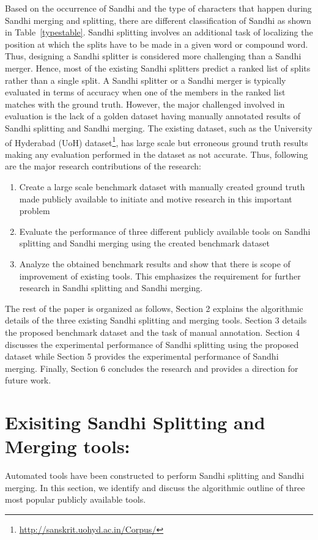 \documentclass[11pt]{article}
\begin{document}
Based on the occurrence of Sandhi and the type of characters that happen during Sandhi merging and splitting, there are different classification of Sandhi as shown in Table~\ref{typestable}. Sandhi splitting involves an additional task of localizing the position at which the splits have to be made in a given word or compound word. Thus, designing a Sandhi splitter is considered more challenging than a Sandhi merger. Hence, most of the existing Sandhi splitters predict a ranked list of splits rather than a single split. A Sandhi splitter or a Sandhi merger is typically evaluated in terms of accuracy when one of the members in the ranked list matches with the ground truth. However, the major challenged involved in evaluation is the lack of a golden dataset having manually annotated results of Sandhi splitting and Sandhi merging. The existing dataset, such as the University of Hyderabad (UoH) dataset\footnote{\url{http://sanskrit.uohyd.ac.in/Corpus/}}, has large scale but erroneous ground truth results making any evaluation performed in the dataset as not accurate. Thus, following are the major research contributions of the research:
\begin{enumerate}
	\item Create a large scale benchmark dataset with manually created ground truth made publicly available to initiate and motive research in this important problem
	\item Evaluate the performance of three different publicly available tools on Sandhi splitting and Sandhi merging using the created benchmark dataset
	\item Analyze the obtained benchmark results and show that there is scope of improvement of existing tools. This emphasizes the requirement for further research in Sandhi splitting and Sandhi merging.
\end{enumerate}

The rest of the paper is organized as follows, Section 2 explains the algorithmic details of the three existing Sandhi splitting and merging tools. Section 3 details the proposed benchmark dataset and the task of manual annotation. Section 4 discusses the experimental performance of Sandhi splitting using the proposed dataset while Section 5 provides the experimental performance of Sandhi merging. Finally, Section 6 concludes the research and provides a direction for future work. 


\section{Exisiting Sandhi Splitting and Merging tools:}
Automated tools have been constructed to perform Sandhi splitting and Sandhi merging. In this section, we identify and discuss the algorithmic outline of three most popular publicly available tools.
\end{document}
